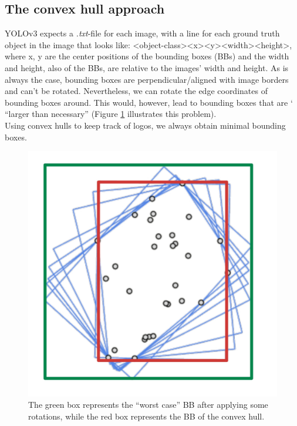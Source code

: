 \documentclass[a4paper]{article}
\begin{document}
\subsection*{The convex hull approach}
YOLOv3 expects a \textit{.txt}-file for each image, with a line for each ground truth object in the image that looks like:
<object-class><x><y><width><height>, where x, y are the center positions of the bounding boxes (BBs) and the width and height, also of the BBs, are relative to the images' width and height.  
As is always the case, bounding boxes are perpendicular/aligned with image borders and can't be rotated. Nevertheless, we can rotate the edge coordinates of bounding boxes around. This would, however, lead to bounding boxes that are ` ``larger than necessary'' (Figure \ref{bb-ch} illustrates this problem).\\
Using convex hulls to keep track of logos, we always obtain minimal bounding boxes. 


\begin{figure}[h]
\centering
\includegraphics[scale=0.15]{images/ch_vs_bb} 
\caption{The green box represents the ``worst case'' BB after applying some rotations, while the red box represents the BB of the convex hull.}
\label{bb-ch}
\end{figure}
\end{document}
